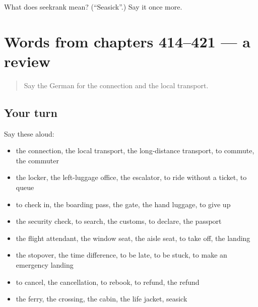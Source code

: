 \begin{tcolorbox}[breakable,colback=teal!4,colframe=teal!35!black,title={Before you move on}]
What does seekrank mean? (\textquotedblleft{}Seasick\textquotedblright{}.) Say it once more.
\end{tcolorbox}
\section[(dialogue)]{Words from chapters 414–421 — a review}

\label{lesson:GE-R421-review-414-421}



\begin{quote}
Say the German for the connection and the local transport.
\end{quote}

\subsection*{Your turn}
Say these aloud:

\begin{itemize}
\raggedright
  \item the connection, the local transport, the long-distance transport, to commute, the commuter
  \item the locker, the left-luggage office, the escalator, to ride without a ticket, to queue
  \item to check in, the boarding pass, the gate, the hand luggage, to give up
  \item the security check, to search, the customs, to declare, the passport
  \item the flight attendant, the window seat, the aisle seat, to take off, the landing
  \item the stopover, the time difference, to be late, to be stuck, to make an emergency landing
  \item to cancel, the cancellation, to rebook, to refund, the refund
  \item the ferry, the crossing, the cabin, the life jacket, seasick
\end{itemize}

